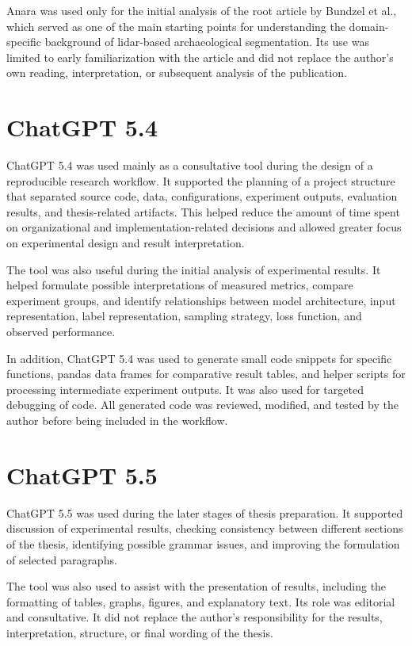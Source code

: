 Anara was used only for the initial analysis of the root article by Bundzel et al., which served as one of the main starting points for understanding the domain-specific background of \gls{lidar}-based archaeological segmentation. Its use was limited to early familiarization with the article and did not replace the author's own reading, interpretation, or subsequent analysis of the publication.

\section{ChatGPT 5.4}

ChatGPT 5.4 was used mainly as a consultative tool during the design of a reproducible research workflow. It supported the planning of a project structure that separated source code, data, configurations, experiment outputs, evaluation results, and thesis-related artifacts. This helped reduce the amount of time spent on organizational and implementation-related decisions and allowed greater focus on experimental design and result interpretation.

The tool was also useful during the initial analysis of experimental results. It helped formulate possible interpretations of measured metrics, compare experiment groups, and identify relationships between model architecture, input representation, label representation, sampling strategy, loss function, and observed performance.

In addition, ChatGPT 5.4 was used to generate small code snippets for specific functions, pandas data frames for comparative result tables, and helper scripts for processing intermediate experiment outputs. It was also used for targeted debugging of code. All generated code was reviewed, modified, and tested by the author before being included in the workflow.

\section{ChatGPT 5.5}

ChatGPT 5.5 was used during the later stages of thesis preparation. It supported discussion of experimental results, checking consistency between different sections of the thesis, identifying possible grammar issues, and improving the formulation of selected paragraphs.

The tool was also used to assist with the presentation of results, including the formatting of tables, graphs, figures, and explanatory text. Its role was editorial and consultative. It did not replace the author's responsibility for the results, interpretation, structure, or final wording of the thesis.

